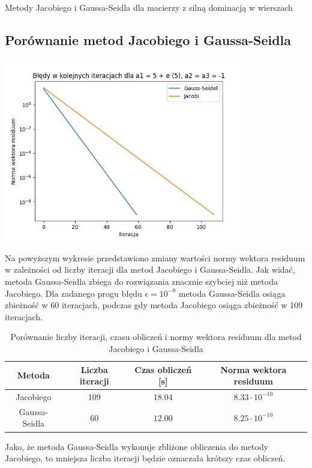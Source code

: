 \documentclass{article}
\begin{document}
\begin{section}{Metody Jacobiego i Gaussa-Seidla dla macierzy z silną dominacją w wierszach}
    \subsection{Porównanie metod Jacobiego i Gaussa-Seidla}
    \begin{center}
        \includegraphics[width=0.8\textwidth]{bledy_zbiezne.png}
    \end{center}
    Na powyższym wykresie przedstawiono zmiany wartości normy wektora residuum w zależności od liczby iteracji
    dla metod Jacobiego i Gaussa-Seidla. Jak widać, metoda Gaussa-Seidla zbiega do rozwiązania znacznie szybciej
    niż metoda Jacobiego. Dla zadanego progu błędu $\epsilon = 10^{-9}$ metoda Gaussa-Seidla osiąga zbieżność w 60
    iteracjach, podczas gdy metoda Jacobiego osiąga zbieżność w 109 iteracjach.
    \begin{table}[H]
        \centering
        \begin{tabular}{|c|c|c|c|}
            \hline
            Metoda & Liczba iteracji & Czas obliczeń [s] & Norma wektora residuum \\
            \hline
            Jacobiego & $109$ & $18.04$ & $8.33\cdot10^{-10}$ \\
            Gaussa-Seidla & $60$ & $12.00$ & $8.25\cdot10^{-10}$ \\
            \hline
        \end{tabular}
        \caption{Porównanie liczby iteracji, czasu obliczeń i normy wektora residuum dla metod Jacobiego i Gaussa-Seidla}
    \end{table}
    Jako, że metoda Gaussa-Seidla wykonuje zbliżone obliczenia do metody Jacobiego, to mniejsza liczba iteracji 
    będzie oznaczała krótszy czas obliczeń.
\end{section}
\end{document}
